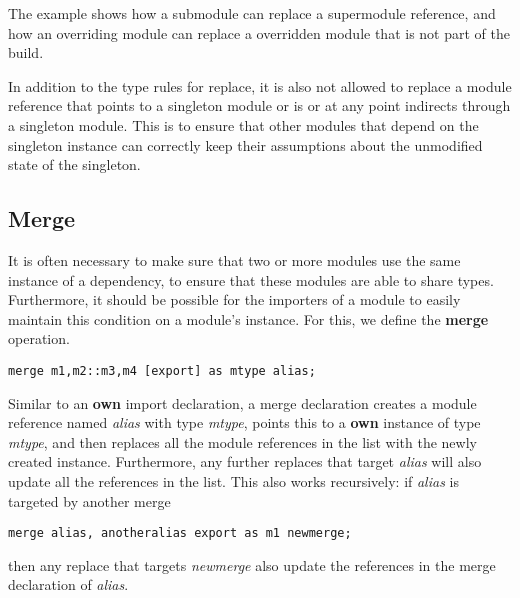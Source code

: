 The example shows how a submodule can replace a supermodule
reference, and how an overriding module can replace a overridden module
that is not part of the build.

In addition to the type rules for replace, it is also not allowed to 
replace a module reference that points to a singleton module or
is or at any point indirects through a singleton module. This is to ensure that other
modules that depend on the singleton instance can correctly keep their
assumptions about the unmodified state of the singleton.



\subsection{Merge}

It is often necessary to make sure that two or more modules use the same
instance of a dependency, to ensure that these
modules are able to share types. Furthermore, it should be possible for
the importers of a module to easily maintain this condition on a module's
instance. For this, we define the \textbf{merge} operation.

\begin{lstlisting}
merge m1,m2::m3,m4 [export] as mtype alias;
\end{lstlisting}

Similar to an \textbf{own} import declaration, a merge declaration creates
a module reference named \textit{alias} with type \textit{mtype},
points this to a \textbf{own} instance of type \textit{mtype}, and then replaces all
the module references in the list with the newly created instance. Furthermore,
any further replaces that target \textit{alias} will also update all
the references in the list. This also works recursively: if \textit{alias}
is targeted by another merge 
\begin{lstlisting}
merge alias, anotheralias export as m1 newmerge;
\end{lstlisting}
then any replace that targets \textit{newmerge} also update the references
in the merge declaration of \textit{alias}.

